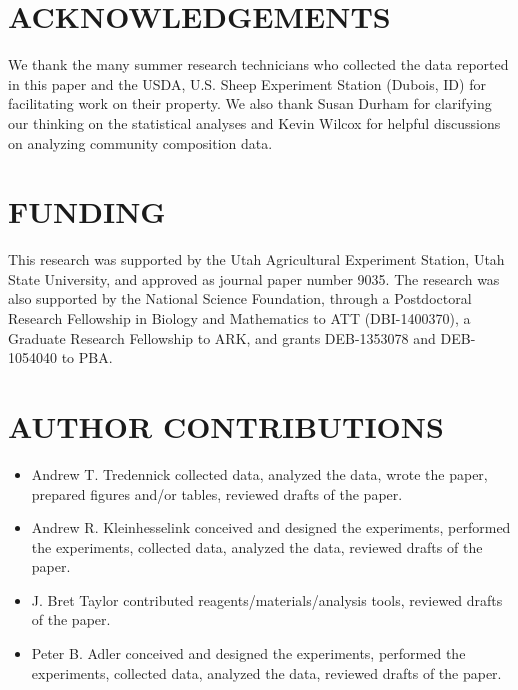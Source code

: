 \documentclass[fleqn,10pt,lineno]{wlpeerj} %
\begin{document}
\hypertarget{acknowledgements}{%
\section{ACKNOWLEDGEMENTS}\label{acknowledgements}}

We thank the many summer research technicians who collected the data
reported in this paper and the USDA, U.S. Sheep Experiment Station
(Dubois, ID) for facilitating work on their property. We also thank
Susan Durham for clarifying our thinking on the statistical analyses and
Kevin Wilcox for helpful discussions on analyzing community composition
data.

\hypertarget{funding}{%
\section{FUNDING}\label{funding}}

This research was supported by the Utah Agricultural Experiment Station,
Utah State University, and approved as journal paper number 9035. The
research was also supported by the National Science Foundation, through
a Postdoctoral Research Fellowship in Biology and Mathematics to ATT
(DBI-1400370), a Graduate Research Fellowship to ARK, and grants
DEB-1353078 and DEB-1054040 to PBA.

\hypertarget{author-contributions}{%
\section{AUTHOR CONTRIBUTIONS}\label{author-contributions}}

\begin{itemize}
  \item Andrew T. Tredennick collected data, analyzed the data, wrote the paper, prepared figures and/or tables, reviewed drafts of the paper.
  \item Andrew R. Kleinhesselink conceived and designed the experiments, performed the experiments, collected data, analyzed the data, reviewed drafts of the paper.
  \item J. Bret Taylor contributed reagents/materials/analysis tools, reviewed drafts of the paper.
  \item Peter B. Adler conceived and designed the experiments, performed the experiments, collected data, analyzed the data, reviewed drafts of the paper.
\end{itemize}
\end{document}
